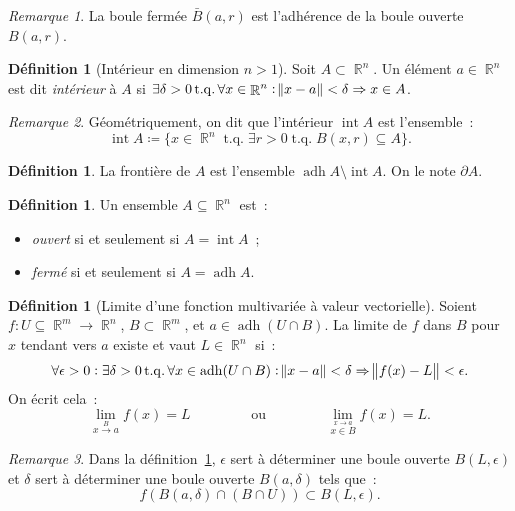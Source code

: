 \documentclass{article}
\DeclareMathOperator{\intr}{int}
\DeclareMathOperator{\R}{\mathbb R}
\DeclareMathOperator{\adh}{adh}
\DeclareMathOperator{\tq}{ t.q. }
\theoremstyle{definition}
\newtheorem{déf}[thm]{Définition}
\theoremstyle{remark}
\newtheorem*{rmq}{Remarque}
\begin{document}
		\begin{rmq} La boule fermée $\bar B(a, r)$ est l'adhérence de la boule ouverte $B(a, r)$. \end{rmq}

		\begin{déf}[Intérieur en dimension $n > 1$] Soit $A \subset \R^n$. Un élément $a \in \R^n$ est dit \emph{intérieur} à $A$ si
		$\exists \delta > 0 \tq \forall x \in \R^n : \norm {x-a} < \delta \Rightarrow x \in A$. \end{déf}

		\begin{rmq} Géométriquement, on dit que l'intérieur $\intr A$ est l'ensemble~:
		\[\intr A \coloneqq \{x \in \R^n \tq \exists r > 0 \tq B(x, r) \subseteq A\}.\]
		\end{rmq}

		\begin{déf} La frontière de $A$ est l'ensemble $\adh A \setminus \intr A$. On le note $\partial A$. \end{déf}

		\begin{déf} Un ensemble $A \subseteq \R^n$ est~:
		\begin{itemize}
			\item \emph{ouvert} si et seulement si $A = \intr A$~;
			\item \emph{fermé} si et seulement si $A = \adh A$.
		\end{itemize}
		\end{déf}

		\begin{déf}[Limite d'une fonction multivariée à valeur vectorielle]\label{def:limfrmrn} Soient $f : U \subseteq \R^m \to \R^n$, $B \subset \R^m$, et
		$a \in \adh(U \cap B)$. La limite de $f$ dans $B$ pour $x$ tendant vers $a$ existe et vaut $L \in \R^n$ si~:
		\[\forall \epsilon > 0 : \exists \delta > 0 \tq \forall x \in \adh(U \cap B) : \norm{x-a} < \delta \Rightarrow \norm{f(x)-L} < \epsilon.\]
		On écrit cela~:
		\[\lim_{\stackrel B{x \to a}}f(x) = L\qquad\qquad\text{ ou }\qquad\qquad\lim_{\stackrel {x \to a}{x \in B}}f(x) = L.\]
		\end{déf}

		\begin{rmq} Dans la définition~\ref{def:limfrmrn}, $\epsilon$ sert à déterminer une boule ouverte $B(L, \epsilon)$ et $\delta$ sert à déterminer une
		boule ouverte $B(a, \delta)$ tels que~:
		\[f\left(B(a, \delta) \cap (B \cap U)\right) \subset B(L, \epsilon).\]
		\end{rmq}
\end{document}
